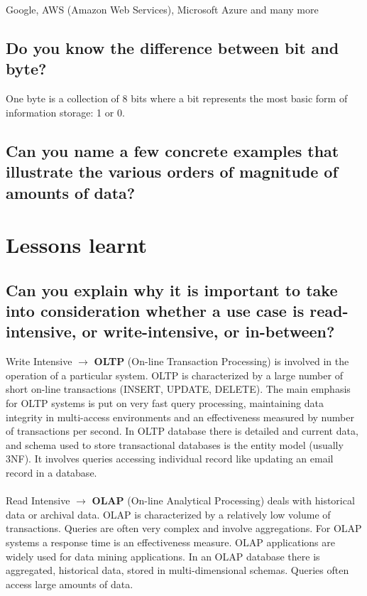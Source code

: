 \documentclass{article}
\begin{document}
Google, AWS (Amazon Web Services), Microsoft Azure and many more

\subsection{Do you know the difference between bit and byte?}

One byte is a collection of 8 bits where a bit represents the most basic form of information storage: 1 or 0.

\subsection{Can you name a few concrete examples that illustrate the various orders of magnitude of amounts of data?}



\pagebreak

\section{Lessons learnt}
\subsection{Can you explain why it is important to take into consideration whether a use case is read-intensive, or write-intensive, or in-between?}


Write Intensive $\rightarrow$ \textbf{OLTP} (On-line Transaction Processing) is involved in the operation of a particular system. OLTP is characterized by a large number of short on-line transactions (INSERT, UPDATE, DELETE). The main emphasis for OLTP systems is put on very fast query processing, maintaining data integrity in multi-access environments and an effectiveness measured by number of transactions per second. In OLTP database there is detailed and current data, and schema used to store transactional databases is the entity model (usually 3NF). It involves queries accessing individual record like updating an email record in a database.\\\\

\noindent Read Intensive $\rightarrow$ \textbf{OLAP} (On-line Analytical Processing) deals with historical data or archival data. OLAP is characterized by a relatively low volume of transactions. Queries are often very complex and involve aggregations. For OLAP systems a response time is an effectiveness measure. OLAP applications are widely used for data mining applications. In an OLAP database there is aggregated, historical data, stored in multi-dimensional schemas. Queries often access large amounts of data.
\end{document}
